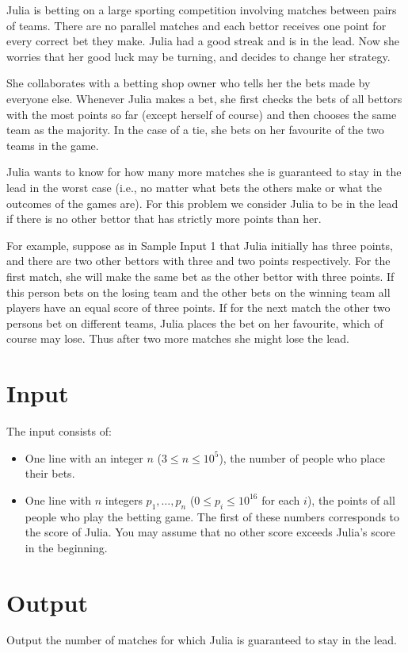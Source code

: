 Julia is betting on a large sporting competition involving matches between pairs
of teams. There are no parallel matches and each bettor receives one point for
every correct bet they make. Julia had a good streak and is in the lead.  Now she
worries that her good luck may be turning, and decides to change her strategy.

She collaborates with a betting shop owner who tells her the bets made by
everyone else. Whenever Julia makes a bet, she first checks the bets of all
bettors with the most points so far (except herself of course) and then chooses
the same team as the majority. In the case of a tie, she bets on her favourite
of the two teams in the game.

Julia wants to know for how many more
matches she is guaranteed to stay in the lead in the worst case (i.e., no
matter what bets the others make or what the outcomes of the games are).
For this problem we consider Julia to be in the lead if there is no other
bettor that has strictly more
points than her.

For example, suppose as in Sample Input 1 that Julia initially has
three points, and there are two other bettors with three and two
points respectively. For the first match, she will make the same bet
as the other bettor with three points.  If this person bets on the
losing team and the other bets on the winning team all players have an
equal score of three points.  If for the next match the other two persons bet on
different teams, Julia places the bet on her favourite, which of course
may lose.  Thus after two more matches she might lose the lead.

\section*{Input}
The input consists of:
\begin{itemize}
    \item One line with an integer $n$ ($3 \le n \le 10^5$), the
	    number of people who place their bets.
    \item One line with $n$ integers $p_1, \ldots, p_n$ ($0\le p_i \le 10^{16}$ for each $i$), the points
	    of all people who play the betting game. The first of these numbers
		corresponds to the score of Julia. You may assume that no
		other score exceeds Julia's score in the beginning.
\end{itemize}

\section*{Output}
Output the number of matches for which Julia is guaranteed to stay
in the lead.
